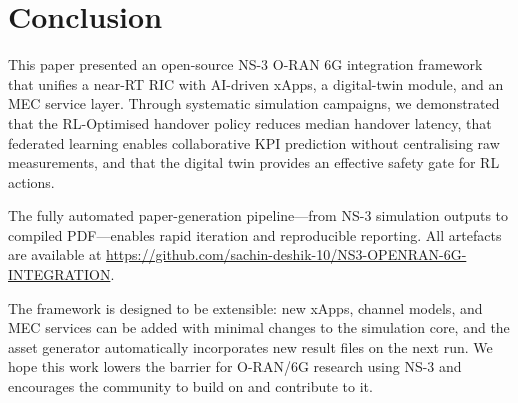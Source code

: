 \section{Conclusion}
\label{sec:conclusion}

This paper presented an open-source NS-3 O-RAN 6G integration framework
that unifies a near-RT RIC with AI-driven xApps, a digital-twin module,
and an MEC service layer.
Through systematic simulation campaigns, we demonstrated that the
RL-Optimised handover policy reduces median handover latency, that
federated learning enables collaborative KPI prediction without centralising
raw measurements, and that the digital twin provides an effective safety
gate for RL actions.

The fully automated paper-generation pipeline---from NS-3 simulation
outputs to compiled PDF---enables rapid iteration and reproducible
reporting.
All artefacts are available at \url{https://github.com/sachin-deshik-10/NS3-OPENRAN-6G-INTEGRATION}.

The framework is designed to be extensible: new xApps, channel models, and
MEC services can be added with minimal changes to the simulation core,
and the asset generator automatically incorporates new result files on
the next run.
We hope this work lowers the barrier for O-RAN/6G research using NS-3 and
encourages the community to build on and contribute to it.
